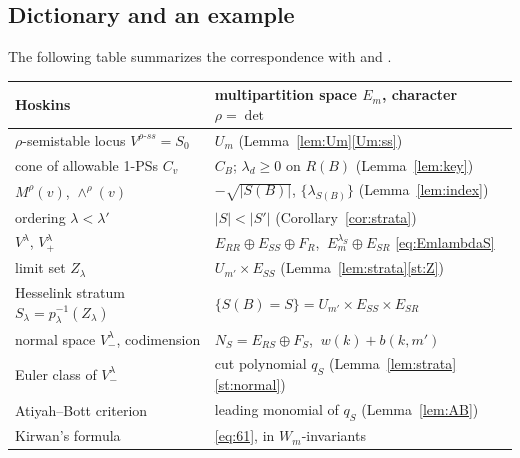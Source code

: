 \documentclass[11pt]{amsart}
\theoremstyle{definition}
\theoremstyle{remark}
\numberwithin{equation}{section}
\begin{document}
\subsection{Dictionary and an example}\label{subsec:dictionary}
The following table summarizes the correspondence with \cite[\S2]{Hos} and \cite{Kir}.
\begin{center}
\renewcommand{\arraystretch}{1.25}
\begin{tabular}{ll}
\hline
Hoskins \cite[\S2]{Hos} & multipartition space $E_m$, character $\rho=\det$\\
\hline
$\rho$-semistable locus $V^{\rho\text{-}ss}=S_0$ & $U_m$ (Lemma~\ref{lem:Um}\ref{Um:ss})\\
cone of allowable 1-PSs $C_v$ & $C_B$; $\lambda_d\ge0$ on $R(B)$ (Lemma~\ref{lem:key})\\
$M^\rho(v)$, $\wedge^\rho(v)$ & $-\sqrt{|S(B)|}$, $\{\lambda_{S(B)}\}$ (Lemma~\ref{lem:index})\\
ordering $\lambda<\lambda'$ & $|S|<|S'|$ (Corollary~\ref{cor:strata})\\
$V^\lambda$, $V^\lambda_+$ & $E_{RR}\oplus E_{SS}\oplus F_R$, $\ E_m^{\lambda_S}\oplus E_{SR}$
  \eqref{eq:EmlambdaS}\\
limit set $Z_\lambda$ & $U_{m'}\times E_{SS}$ (Lemma~\ref{lem:strata}\ref{st:Z})\\
Hesselink stratum $S_\lambda=p_\lambda^{-1}(Z_\lambda)$ & $\{S(B)=S\}=U_{m'}\times E_{SS}\times E_{SR}$\\
normal space $V^\lambda_-$, codimension & $N_S=E_{RS}\oplus F_S$, $\ w(k)+b(k,m')$\\
Euler class of $V^\lambda_-$ & cut polynomial $q_S$ (Lemma~\ref{lem:strata}\ref{st:normal})\\
Atiyah--Bott criterion & leading monomial of $q_S$ (Lemma~\ref{lem:AB})\\
Kirwan's formula & \eqref{eq:61}, in $W_m$-invariants\\
\hline
\end{tabular}
\end{center}
\end{document}
